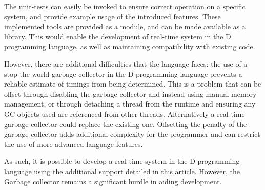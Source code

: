 The unit-tests can easily be invoked to ensure correct operation on a specific
system, and provide example usage of the introduced features. 
These implemented tools are provided as a module, and can be made available as 
a library. This would enable the development of real-time system in the D programming 
language, as well as maintaining compatibility with existing code. 
\par\bigskip\noindent
However, there are additional difficulties that the 
language faces: the use of a stop-the-world garbage collector in the 
D programming language prevents a reliable estimate of timings from being determined. 
This is a problem that can be offset through disabling the garbage collector 
and instead using manual memory management, or through detaching a thread from the 
runtime and ensuring any GC objects used are referenced from other threads.
Alternatively a real-time garbage collector could replace the existing one. 
Offsetting the penalty of the garbage collector adds additional complexity for 
the programmer and can restrict the use of more advanced language features. 
\par\bigskip\noindent
As such, it is possible to develop a real-time system in the D programming 
language using the additional support detailed in this article. However, 
the Garbage collector remains a significant hurdle in aiding development.
